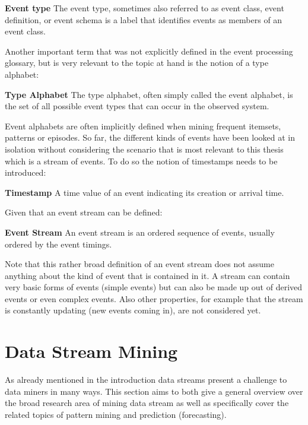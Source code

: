 \begin{mydef}
\textbf{Event type} The event type, sometimes also referred to as event class, event definition, or event schema is a label that identifies events as members of an event class.
\end{mydef}

Another important term that was not explicitly defined in the event processing glossary, but is very relevant to the topic at hand is the notion of a type alphabet:

\begin{mydef}
\textbf{Type Alphabet} The type alphabet, often simply called the event alphabet, is the set of all possible event types that can occur in the observed system.
\end{mydef}

Event alphabets are often implicitly defined when mining frequent itemsets, patterns or episodes. So far, the different kinds of events have been looked at in isolation without considering the scenario that is most relevant to this thesis which is a stream of events. To do so the notion of timestamps needs to be introduced:

\begin{mydef}
\textbf{Timestamp} A time value of an event indicating its creation or arrival time.
\end{mydef}

Given that an event stream can be defined:

\begin{mydef}
\textbf{Event Stream} An event stream is an ordered sequence of events, usually ordered by the event timings.
\end{mydef}

Note that this rather broad definition of an event stream does not assume anything about the kind of event that is contained in it. A stream can contain very basic forms of events (simple events) but can also be made up out of derived events or even complex events. Also other properties, for example that the stream is constantly updating (new events coming in), are not considered yet.


\section{Data Stream Mining}
\label{sec_streamMining}
As already mentioned in the introduction data streams present a challenge to data miners in many ways. This section aims to both give a general overview over the broad research area of mining data stream as well as specifically cover the related topics of pattern mining and prediction (forecasting). \\

